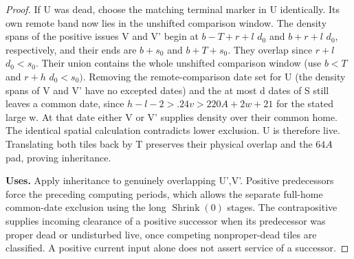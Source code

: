 \begin{proof}
If U was dead, choose the matching terminal marker in U identically. Its own remote band now lies in the unshifted comparison window. The density spans of the positive issues V and V' begin at \(b- T+r+l\) \(d_0\) and \(b+r+l\) \(d_0\), respectively, and their ends are \(b+s_0\) and \(b+T+s_0\). They overlap since \(r+l\) \(d_0<s_0\). Their union contains the whole unshifted comparison window (use \(b<T\) and \(r+h\) \(d_0<s_0)\). Removing the remote-comparison date set for U (the density spans of V and V' have no excepted dates) and the at most d dates of S still leaves a common date, since \(h-l-2>.24v>220A+2w+21\) for the stated large w. At that date either V or V' supplies density over their common home. The identical spatial calculation contradicts lower exclusion. U is therefore live. Translating both tiles back by T preserves their physical overlap and the \(64A\) pad, proving inheritance.

\textbf{Uses.} Apply inheritance to genuinely overlapping U',V'. Positive predecessors force the preceding computing periods, which allows the separate full-home common-date exclusion using the long \(\operatorname{Shrink}(0)\) stages. The contrapositive supplies incoming clearance of a positive successor when its predecessor was proper dead or undisturbed live, once competing nonproper-dead tiles are classified. A positive current input alone does not assert service of a successor.
\end{proof}

